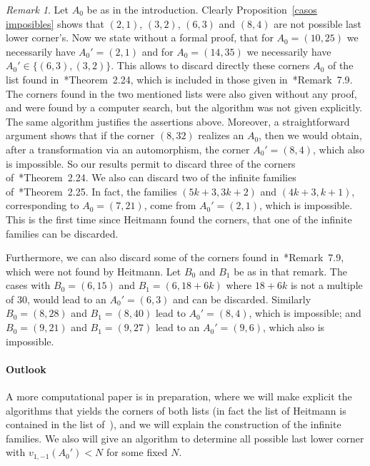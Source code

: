 \documentclass[reqno,a4paper]{amsart}
\theoremstyle{definition}
\theoremstyle{remark}
\newtheorem{remark}[theorem]{Remark}
\begin{document}
\begin{remark} Let $A_0$ be as in the introduction. Clearly Proposition~\ref{casos imposibles} shows that $(2,1)$, $(3,2)$, $(6,3)$ and $(8,4)$ are not possible last lower corner's. Now we state without a formal proof, that for $A_0=(10,25)$ we necessarily have $A_0'=(2,1)$ and for $A_0=(14,35)$ we necessarily have $A_0'\in\{(6,3),(3,2)\}$. This allows to discard directly these corners $A_0$ of the list found in~\cite{H}*{Theorem~2.24}, which is included in those given in~\cite{GGV}*{Remark~7.9}.  The corners found in the two mentioned lists were also given without any proof, and were found by a computer search, but the algorithm
was not given explicitly. The same algorithm justifies the assertions above. Moreover, a straightforward argument shows that if the corner $(8,32)$ realizes an $A_0$, then we would obtain, after a transformation via an automorphism, the corner $A_0'=(8,4)$, which also is impossible. So our results permit to discard three of the corners of~\cite{H}*{Theorem~2.24}. We also can discard two of the infinite families of~\cite{H}*{Theorem~2.25}. In fact, the families $(5k+3,3k+2)$ and $(4k+3,k+1)$, corresponding to $A_0=(7,21)$, come from $A_0'=(2,1)$, which is impossible. This is the first time since Heitmann found the corners, that one of the infinite families can be discarded.

Furthermore, we can also discard some of the corners found in~\cite{GGV}*{Remark~7.9}, which were not found by Heitmann. Let $B_0$ and $B_1$ be as in that remark. The cases with $B_0=(6,15)$ and $B_1=(6,18+6k)$ where $18+6k$ is not a multiple of $30$, would lead to an $A_0'=(6,3)$ and can be discarded. Similarly $B_0=(8,28)$ and $B_1=(8,40)$ lead to $A_0'=(8,4)$, which is impossible; and $B_0=(9,21)$ and $B_1=(9,27)$ lead to an $A_0'=(9,6)$, which also is impossible.
\end{remark}


\paragraph*{Outlook}

A more computational paper is in preparation, where we will make explicit the algorithms that yields the corners of both lists (in fact the list of Heitmann is contained in the list of~\cite{GGV}), and we will explain the construction of the infinite families. We also will give an algorithm to determine all possible last lower corner with $v_{1,-1}(A_0')<N$ for some fixed $N$.
\end{document}
